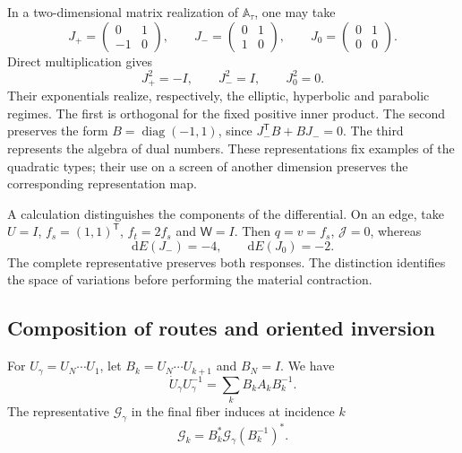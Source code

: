 In a two-dimensional matrix realization of
\(\mathbb A_\tau\), one may take
\[
 J_{+}=\begin{pmatrix}0&1\\-1&0\end{pmatrix},\qquad
 J_{-}=\begin{pmatrix}0&1\\1&0\end{pmatrix},\qquad
 J_{0}=\begin{pmatrix}0&1\\0&0\end{pmatrix}.
\]
Direct multiplication gives
\[
 J_+^2=-I,\qquad J_-^2=I,\qquad J_0^2=0.
\]
Their exponentials realize, respectively, the elliptic,
hyperbolic and parabolic regimes. The first is orthogonal for the fixed
positive inner product. The second preserves the form
\(B=\operatorname{diag}(-1,1)\), since
\(J_-^{\mathsf T}B+BJ_-=0\). The third represents the algebra
of dual numbers. These representations fix examples of the quadratic
types; their use on a screen of another dimension preserves the
corresponding representation map.

A calculation distinguishes the components of the differential. On an edge,
take \(U=I\), \(f_s=(1,1)^{\mathsf T}\),
\(f_t=2f_s\) and \(\mathsf W=I\). Then \(q=v=f_s\),
\(\mathcal J=0\), whereas
\begin{equation}
 \mathrm dE(J_-)=-4,\qquad \mathrm dE(J_0)=-2.
 \label{vii:vii:eq:control-regimenes-corriente}
\end{equation}
The complete representative preserves both responses. The distinction
identifies the space of variations before performing the material
contraction.

\subsection{Composition of routes and oriented inversion}

\begin{proposition}
\label{vii:vii:prop:pullback-invertible}
For \(U_\gamma=U_N\cdots U_1\), let
\(B_k=U_N\cdots U_{k+1}\) and \(B_N=I\). We have
\[
 \dot U_\gamma U_\gamma^{-1}
   =\sum_kB_kA_kB_k^{-1}.
\]
The representative \(\mathcal G_\gamma\) in the final fiber induces
at incidence \(k\)
\begin{equation}
 \mathcal G_k=B_k^*\mathcal G_\gamma(B_k^{-1})^*.
 \label{vii:vii:eq:transporte-contragrediente}
\end{equation}
\end{proposition}

